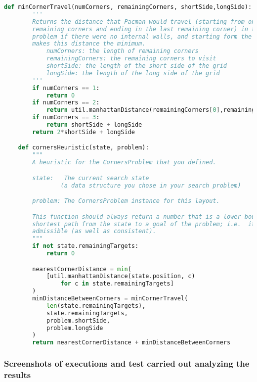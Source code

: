 \documentclass{article}
\begin{document}
\begin{lstlisting}[language=python,captionpos=t,caption={The heuristic definition (\emph{searchAgents.py})}]
    def minCornerTravel(numCorners, remainingCorners, shortSide,longSide):
        '''
        Returns the distance that Pacman would travel (starting from one of the 
        remaining corners and ending in the last remaining corner) in the corners 
        problem if there were no internal walls, and starting form the corner that 
        makes this distance the minimum.
            numCorners: the length of remaining corners
            remainingCorners: the remaining corners to visit
            shortSide: the length of the short side of the grid 
            longSide: the length of the long side of the grid
        '''
        if numCorners == 1:
            return 0
        if numCorners == 2:
            return util.manhattanDistance(remainingCorners[0],remainingCorners[1])
        if numCorners == 3:
            return shortSide + longSide
        return 2*shortSide + longSide

    def cornersHeuristic(state, problem):
        """
        A heuristic for the CornersProblem that you defined.

        state:   The current search state
                (a data structure you chose in your search problem)

        problem: The CornersProblem instance for this layout.

        This function should always return a number that is a lower bound on the
        shortest path from the state to a goal of the problem; i.e.  it should be
        admissible (as well as consistent).
        """
        if not state.remainingTargets:
            return 0

        nearestCornerDistance = min(
            [util.manhattanDistance(state.position, c) 
                for c in state.remainingTargets]
        )    
        minDistanceBetweenCorners = minCornerTravel(
            len(state.remainingTargets), 
            state.remainingTargets, 
            problem.shortSide,
            problem.longSide
        )
        return nearestCornerDistance + minDistanceBetweenCorners
\end{lstlisting}

\subsubsection{Screenshots of executions and test carried out analyzing the results}
\end{document}
